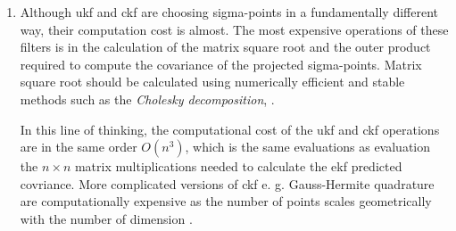 \documentclass[12pt]{article}
\begin{document}
\begin{enumerate}[label=\arabic*)]
    \item
        Although \acrshort{ukf} and \acrshort{ckf} are choosing sigma-points in a fundamentally different way, their computation cost is almost. The most expensive operations of these filters is in the calculation of the matrix square root and the outer product required to compute the covariance of the projected sigma-points. Matrix square root should be calculated using numerically efficient and stable methods such as the \textit{Cholesky decomposition}, \cite{bishop2006pattern, uhlmann1994simultaneous}.
        
        In this line of thinking, the computational cost of the \acrshort{ukf} and \acrshort{ckf} operations are in the same order $O(n^3)$, which is the same evaluations as evaluation the $n\times n$ matrix multiplications needed to calculate the \acrshort{ekf} predicted covriance. More complicated versions of \acrshort{ckf} e. g. Gauss-Hermite quadrature are computationally expensive as the number of points scales geometrically with the number of dimension \cite{julier2004unscented}.
\end{enumerate}



\end{document}
